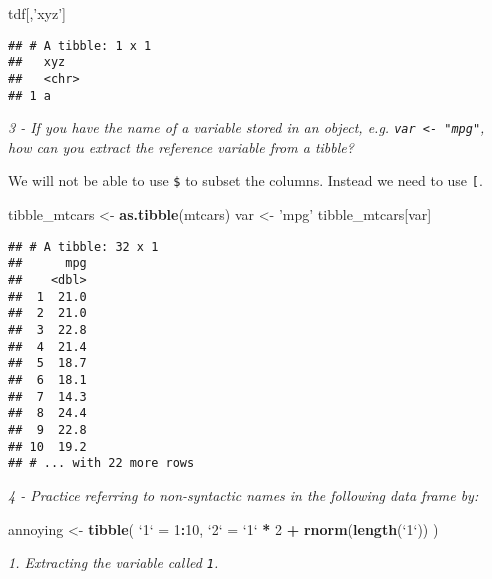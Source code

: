 \documentclass[]{article}
\newenvironment{Shaded}{\begin{snugshade}}{\end{snugshade}}
\newcommand{\KeywordTok}[1]{\textcolor[rgb]{0.13,0.29,0.53}{\textbf{#1}}}
\newcommand{\DataTypeTok}[1]{\textcolor[rgb]{0.13,0.29,0.53}{#1}}
\newcommand{\DecValTok}[1]{\textcolor[rgb]{0.00,0.00,0.81}{#1}}
\newcommand{\StringTok}[1]{\textcolor[rgb]{0.31,0.60,0.02}{#1}}
\newcommand{\OperatorTok}[1]{\textcolor[rgb]{0.81,0.36,0.00}{\textbf{#1}}}
\newcommand{\NormalTok}[1]{#1}
\theoremstyle{definition}
\theoremstyle{definition}
\theoremstyle{definition}
\theoremstyle{remark}
\begin{document}
\begin{Shaded}
\begin{Highlighting}[]
\NormalTok{tdf[,}\StringTok{'xyz'}\NormalTok{]}
\end{Highlighting}
\end{Shaded}

\begin{verbatim}
## # A tibble: 1 x 1
##   xyz  
##   <chr>
## 1 a
\end{verbatim}

\emph{3 - If you have the name of a variable stored in an object, e.g.
\texttt{var\ \textless{}-\ "mpg"}, how can you extract the reference
variable from a tibble?}

We will not be able to use \texttt{\$} to subset the columns. Instead we
need to use \texttt{{[}\textasciigrave{}\textasciigrave{}{]}}.

\begin{Shaded}
\begin{Highlighting}[]
\NormalTok{tibble_mtcars <-}\StringTok{ }\KeywordTok{as.tibble}\NormalTok{(mtcars)}
\NormalTok{var <-}\StringTok{ 'mpg'}
\NormalTok{tibble_mtcars[var]}
\end{Highlighting}
\end{Shaded}

\begin{verbatim}
## # A tibble: 32 x 1
##      mpg
##    <dbl>
##  1  21.0
##  2  21.0
##  3  22.8
##  4  21.4
##  5  18.7
##  6  18.1
##  7  14.3
##  8  24.4
##  9  22.8
## 10  19.2
## # ... with 22 more rows
\end{verbatim}

\emph{4 - Practice referring to non-syntactic names in the following
data frame by:}

\begin{Shaded}
\begin{Highlighting}[]
\NormalTok{annoying <-}\StringTok{ }\KeywordTok{tibble}\NormalTok{(}
  \StringTok{`}\DataTypeTok{1}\StringTok{`}\NormalTok{ =}\StringTok{ }\DecValTok{1}\OperatorTok{:}\DecValTok{10}\NormalTok{,}
  \StringTok{`}\DataTypeTok{2}\StringTok{`}\NormalTok{ =}\StringTok{ `}\DataTypeTok{1}\StringTok{`} \OperatorTok{*}\StringTok{ }\DecValTok{2} \OperatorTok{+}\StringTok{ }\KeywordTok{rnorm}\NormalTok{(}\KeywordTok{length}\NormalTok{(}\StringTok{`}\DataTypeTok{1}\StringTok{`}\NormalTok{))}
\NormalTok{)}
\end{Highlighting}
\end{Shaded}

\emph{1. Extracting the variable called \texttt{1}.}
\end{document}
